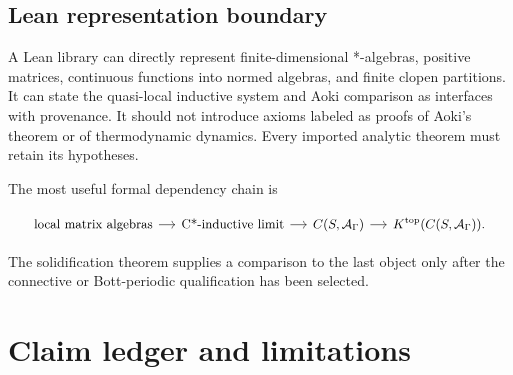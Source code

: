 \documentclass[12pt]{article}
\theoremstyle{definition}
\theoremstyle{remark}
\newcommand{\A}{\mathcal A}
\newcommand{\Ktop}{K^{\mathrm{top}}}
\begin{document}
\subsection{Lean representation boundary}

A Lean library can directly represent finite-dimensional *-algebras, positive
matrices, continuous functions into normed algebras, and finite clopen partitions.
It can state the quasi-local inductive system and Aoki comparison as interfaces with
provenance.  It should not introduce axioms labeled as proofs of Aoki's theorem or of
thermodynamic dynamics.  Every imported analytic theorem must retain its hypotheses.

The most useful formal dependency chain is

\[
\begin{tikzcd}[column sep=small,cells={font=\small}]
\text{local matrix algebras}
  \arrow[r]
& \text{C*-inductive limit}
  \arrow[r]
& C(S,\A_\Gamma)
  \arrow[r]
& \Ktop(C(S,\A_\Gamma)).
\end{tikzcd}
\]

The solidification theorem supplies a comparison to the last object only after the
connective or Bott-periodic qualification has been selected.

\section{Claim ledger and limitations}
\end{document}
